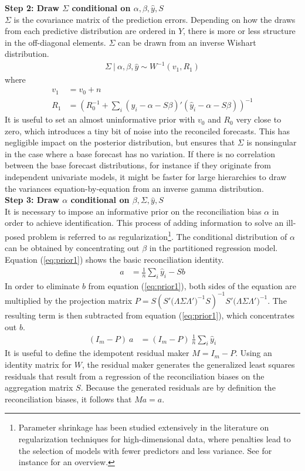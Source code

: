 \documentclass[a4paper,fleqn,11pt]{article}
\begin{document}
\noindent\textbf{Step 2: Draw $\Sigma$ conditional on $\alpha,\beta,\hat{y},S$}\\
$\Sigma$ is the covariance matrix of the prediction errors. Depending on how the draws from each predictive distribution are ordered in $Y$, there is more or less structure in the off-diagonal elements. $\Sigma$ can be drawn from an inverse Wishart distribution.
\begin{align}
\Sigma\ |\ \alpha,\beta,\hat{y} \sim W^{-1}(v_1,R_1)
\end{align}
where
\begin{align*}
v_1 &= v_0 + n\\
R_1 &=  \left( R_0^{-1} + \sum_i (\hat{y}_i - \alpha - S \beta)'(\hat{y}_i - \alpha - S \beta) \right)^{-1}
\end{align*}
It is useful to set an almost uninformative prior with $v_0$ and $R_0$ very close to zero, which introduces a tiny bit of noise into the reconciled forecasts. This has negligible impact on the posterior distribution, but ensures that $\Sigma$ is nonsingular in the case where a base forecast has no variation. If there is no correlation between the base forecast distributions, for instance if they originate from independent univariate models, it might be faster for large hierarchies to draw the variances equation-by-equation from an inverse gamma distribution.\\

\noindent\textbf{Step 3: Draw $\alpha$ conditional on $\beta,\Sigma,\hat{y},S$}\\
It is necessary to impose an informative prior on the reconciliation bias $\alpha$ in order to achieve identification. This process of adding information to solve an ill-posed problem is referred to as regularization\footnote{Parameter shrinkage  has been studied extensively in the literature on regularization techniques for high-dimensional data, where penalties lead to the selection of models with fewer predictors and less variance. See for instance \cite{Polson2010} for an overview.}. The conditional distribution of $\alpha$  can be obtained by concentrating out $\beta$ in the partitioned regression model. Equation (\ref{eq:prior1}) shows the basic reconciliation identity.
\begin{align}
	\label{eq:prior1}
	a &= \frac{1}{n}\sum_i \hat{y}_i - Sb
\end{align}
In order to eliminate $b$ from equation (\ref{eq:prior1}), both sides of the equation are multiplied by the projection matrix $P = S(S'\big(\Lambda\Sigma\Lambda'\big)^{-1}S)^{-1}S'\big(\Lambda\Sigma\Lambda'\big)^{-1}$. The resulting term is then subtracted from equation (\ref{eq:prior1}), which concentrates out $b$.
\begin{align}
	\label{eq:prior2}
	(I_m - P)\ a &= (I_m - P)\ \frac{1}{n}\sum_i \hat{y}_i  
\end{align}
It is useful to define the idempotent residual maker $M = I_m - P$. Using an identity matrix for $W$, the residual maker generates the generalized least squares residuals that result from a regression of the reconciliation biases on the aggregation matrix $S$. Because the generated residuals are by definition the reconciliation biases, it follows that $Ma = a$.
\end{document}
